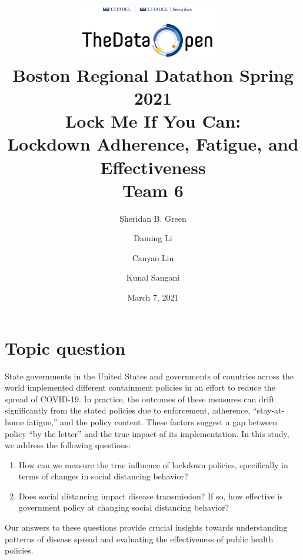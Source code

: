 \documentclass[dvipsnames]{article}
\title{%
\includegraphics[width=0.5\textwidth]{data-open-logo.jpg}~
\\[1cm]
Boston Regional Datathon Spring 2021 \\
\vspace{0.5em}
\textbf{Lock Me If You Can: \\
Lockdown Adherence, Fatigue, and Effectiveness} \\[0.5em]
\large Team 6}
\author[1]{Sheridan B. Green}
\author[1]{Daming Li}
\author[2]{Canyao Liu}
\author[3]{Kunal Sangani}
\affil[1]{Department of Physics, Yale University}
\affil[2]{Yale School of Management}
\affil[3]{Harvard Business School}
\date{March 7, 2021}
\newcommand{\dl}[1]{{\color{Plum}{{[DL: \bf #1]}}}}
\newcommand{\ks}[1]{{\color{ForestGreen}{{[KS: \bf #1]}}}}
\begin{document}
\maketitle

\section{Topic question}

State governments in the United States and governments of countries across the world implemented different containment policies in an effort to reduce the spread of COVID-19. In practice, the outcomes of these measures can drift significantly from the stated policies due to enforcement, adherence, ``stay-at-home fatigue,'' and the policy content. These factors suggest a gap between policy ``by the letter'' and the true impact of its implementation. In this study, we address the following questions:

%
\begin{enumerate}
    \item How can we measure the true influence of lockdown policies, specifically in terms of changes in social distancing behavior?
    \item Does social distancing impact disease transmission? If so, how effective is government policy at changing social distancing behavior? 
\end{enumerate}
%

Our answers to these questions provide crucial insights towards understanding patterns of disease spread and evaluating the effectiveness of public health policies.
\pagebreak
\end{document}
